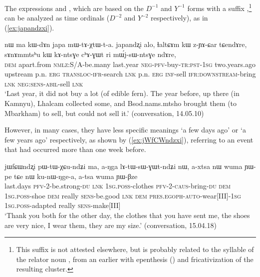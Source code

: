  The expressions   and , which are based on the $D^{-1}$ and $Y^{-1}$ forms with a suffix ,\footnote{This suffix  is not attested elsewhere, but is probably related to the syllable  of the relator noun , from an earlier  with epenthesis () and fricativization of the resulting  cluster. } can be analyzed as time ordinals ($D^{-2}$ and $Y^{-2}$ respectively), as in (\ref{ex:japandzxi}).
 
\begin{exe}
\ex \label{ex:japandzxi}
\gll   nɯ ma kɯ-dɤn japa mɯ-tɤ-χtɯ-t-a. japandʐi alo, ɬaltɕɤm kɯ z-ɲɤ-ɕar tɕendɤre, sɤnɤmmtsʰu kɯ kɤ-ntsɣe cʰɤ-ɣɯt ri mɯ́j-sɯ-ntsɣe ndɤre, \\
 \textsc{dem} apart.from \textsc{nmlz}:S/A-be.many last.year \textsc{neg}-\textsc{pfv}-buy-\textsc{tr}:\textsc{pst}-\textsc{1sg}  two.years.ago upstream p.n. \textsc{erg} \textsc{transloc}-\textsc{ifr}-search \textsc{lnk} p.n. \textsc{erg} \textsc{inf}-sell \textsc{ifr}:\textsc{downstream}-bring \textsc{lnk} \textsc{neg}:\textsc{sens}-\textsc{abil}-sell \textsc{lnk} \\
\glt `Last year, it did not buy a lot (of edible fern). The year before, up there (in Kamnyu), Lhalcam collected some, and Bsod.nams.mtsho brought them (to Mbarkham) to sell, but could not sell it.' (conversation, 14.05.10)
\end{exe}

However, in many cases, they have less specific meanings `a few days ago' or `a few years ago' respectively,  as shown by (\ref{ex:jWfCWndzxi}), referring to an event that had occurred more than one week before.

\begin{exe}
\ex \label{ex:jWfCWndzxi}
\gll jɯfɕɯndʐi pɯ-tɯ-χɕu-ndʑi ma, a-ŋga lɤ-tɯ-sɯ-ɣɯt-ndʑi nɯ, a-xtsa nɯ wuma ɲɯ-pe tɕe nɯ ku-nɯ-ŋge-a,  a-tsa wuma ɲɯ-βze \\ 
last.days \textsc{pfv}-2-be.strong-\textsc{du} \textsc{lnk} \textsc{1sg}.\textsc{poss}-clothes \textsc{pfv}-2-\textsc{caus}-bring-\textsc{du} \textsc{dem} \textsc{1sg}.\textsc{poss}-shoe \textsc{dem} really \textsc{sens}-be.good \textsc{lnk} \textsc{dem} \textsc{pres}.\textsc{egoph}-\textsc{auto}-wear[III]-\textsc{1sg}  \textsc{1sg}.\textsc{poss}-adapted really \textsc{sens}-make[III] \\
\glt `Thank you both for the other day, the clothes that you have sent me, the shoes are very nice, I wear them, they are my size.' (conversation, 15.04.18)
\end{exe}

